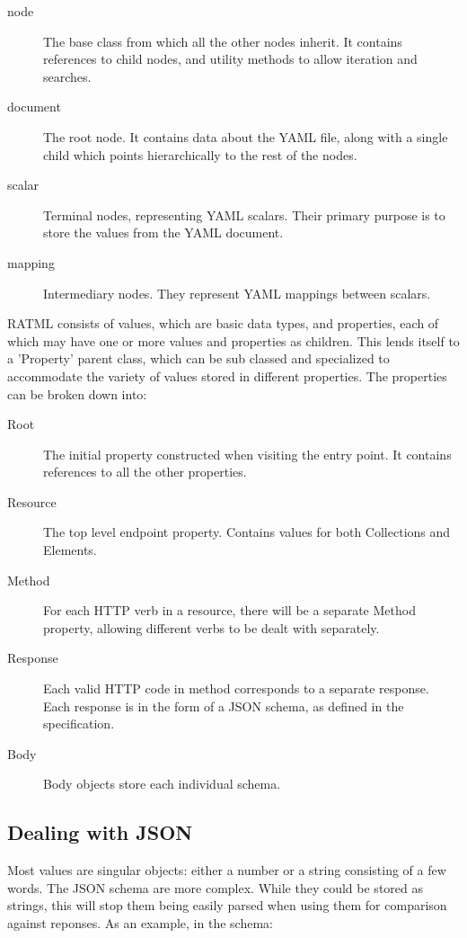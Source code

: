 \begin{description}
\item[node] The base class from which all the other nodes inherit. It contains references to child nodes, and utility methods to allow iteration and searches.
\item[document] The root node. It contains data about the YAML file, along with a single child which points hierarchically to the rest of the nodes.
\item[scalar] Terminal nodes, representing YAML scalars. Their primary purpose is to store the values from the YAML document.
\item[mapping] Intermediary nodes. They represent YAML mappings between scalars.
\end{description}

RATML consists of values, which are basic data types, and properties, each of which may have one or more values and properties as children. This lends itself to a 'Property' parent class, which can be sub classed and specialized to accommodate the variety of values stored in different properties. The properties can be broken down into:

\begin{description}
\item[Root] The initial property constructed when visiting the entry point. It contains references to all the other properties.
\item[Resource] The top level endpoint property. Contains values for both Collections and Elements.
\item[Method] For each HTTP verb in a resource, there will be a separate Method property, allowing different verbs to be dealt with separately.
\item[Response] Each valid HTTP code in method corresponds to a separate response. Each response is in the form of a JSON schema, as defined in the specification.
\item[Body] Body objects store each individual schema.
\end{description}

\subsection{Dealing with JSON}

Most values are singular objects: either a number or a string consisting of a few words. The JSON schema are more complex. While they could be stored as strings, this will stop them being easily parsed when using them for comparison against reponses. As an example, in the schema:

